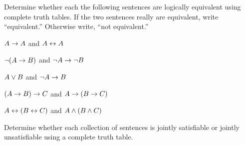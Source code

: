 \problempart
\label{pr.TT.equiv2}
Determine whether each the following sentences are logically equivalent using complete truth tables. If the two sentences really are equivalent, write ``equivalent.'' Otherwise write, ``not equivalent.''
\begin{compactlist}
\item $A\rightarrow A$ and $A \leftrightarrow A$
\item $\neg(A \rightarrow B)$ and $\neg A \rightarrow \neg B$
\item $A \vee B$ and $\neg A \rightarrow B$
\item$(A \rightarrow B) \rightarrow C$ and $A \rightarrow (B \rightarrow C)$
\item $A \leftrightarrow (B \leftrightarrow C)$ and $A \wedge (B \wedge C)$
\end{compactlist}


\problempart
\label{pr.TT.satisfiable2}
Determine whether each collection of sentences is jointly satisfiable or jointly unsatisfiable using a complete truth table.
